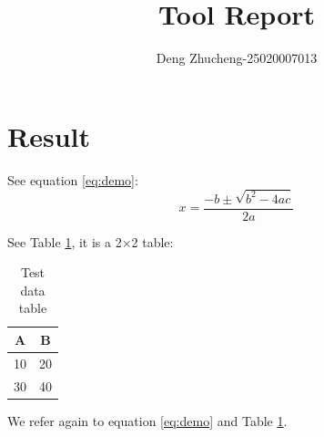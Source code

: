 \documentclass{article}
\begin{document}
\title{Tool Report}
\author{Deng Zhucheng-25020007013}
\maketitle

\section{Result}

See equation \eqref{eq:demo}:
\begin{equation}
\label{eq:demo}
x = \frac{-b\pm\sqrt{b^2-4ac}}{2a}
\end{equation}

See Table \ref{tab:data}, it is a 2×2 table:
\begin{table}[htbp]
\centering
\caption{Test data table}
\label{tab:data}
\begin{tabular}{|c|c|}
\hline
A & B \\
\hline
10 & 20 \\
\hline
30 & 40 \\
\hline
\end{tabular}
\end{table}

We refer again to equation \eqref{eq:demo} and Table \ref{tab:data}.
\end{document}
